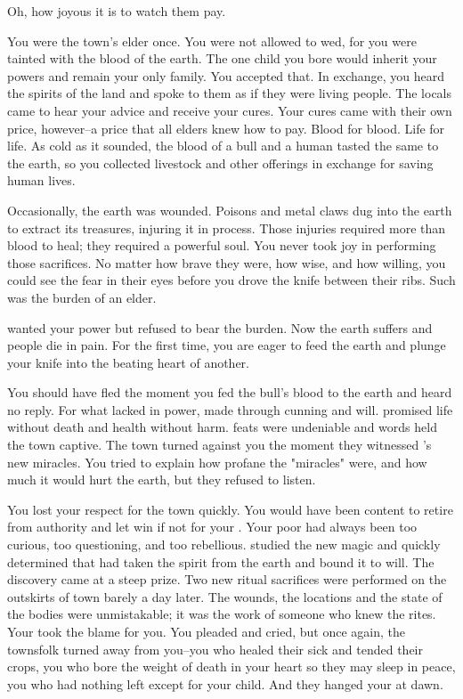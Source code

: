 \documentclass[char]{guildcamp4}
\begin{document}
\name{\cShaman{}}

Oh, how joyous it is to watch them pay.

You were the town's elder once. You were not allowed to wed, for you were tainted with the blood of the earth. The one child you bore would inherit your powers and remain your only family. You accepted that. In exchange, you heard the spirits of the land and spoke to them as if they were living people. The locals came to hear your advice and receive your cures. Your cures came with their own price, however--a price that all elders knew how to pay. Blood for blood. Life for life. As cold as it sounded, the blood of a bull and a human tasted the same to the earth, so you collected livestock and other offerings in exchange for saving human lives. 

Occasionally, the earth was wounded. Poisons and metal claws dug into the earth to extract its treasures, injuring it in process. Those injuries required more than blood to heal; they required a powerful soul. You never took joy in performing those sacrifices. No matter how brave they were, how wise, and how willing, you could see the fear in their eyes before you drove the knife between their ribs. Such was the burden of an elder. 

\cElder{\intro} wanted your power but refused to bear the burden. Now the earth suffers and \cElder{\their} people die in pain. For the first time, you are eager to feed the earth and plunge your knife into the beating heart of another.

You should have fled the moment you fed the bull's blood to the earth and heard no reply. For what \cElder{\they} lacked in power, \cElder{} made through cunning and will. \cElder{} promised life without death and health without harm. \cElder{\Their} feats were undeniable and \cElder{\their} words held the town captive. The town turned against you the moment they witnessed \cElder{}'s new miracles. You tried to explain how profane the "miracles" were, and how much it would hurt the earth, but they refused to listen. 

You lost your respect for the town quickly. You would have been content to retire from authority and let \cElder{} win if not for your \cPlaguebearer{\offspring}. Your poor \cPlaguebearer{} had always been too curious, too questioning, and too rebellious. \cPlaguebearer{\They} studied the new magic and quickly determined that \cElder{} had taken the spirit from the earth and bound it to \cElder{\their} will. The discovery came at a steep prize. Two new ritual sacrifices were performed on the outskirts of town barely a day later. The wounds, the locations and the state of the bodies were unmistakable; it was the work of someone who knew the rites. Your \cPlaguebearer{\offspring} took the blame for you. You pleaded and cried, but once again, the townsfolk turned away from you--you who healed their sick and tended their crops, you who bore the weight of death in your heart so they may sleep in peace, you who had nothing left except for your child. And they hanged your \cPlaguebearer{} at dawn.
\end{document}

